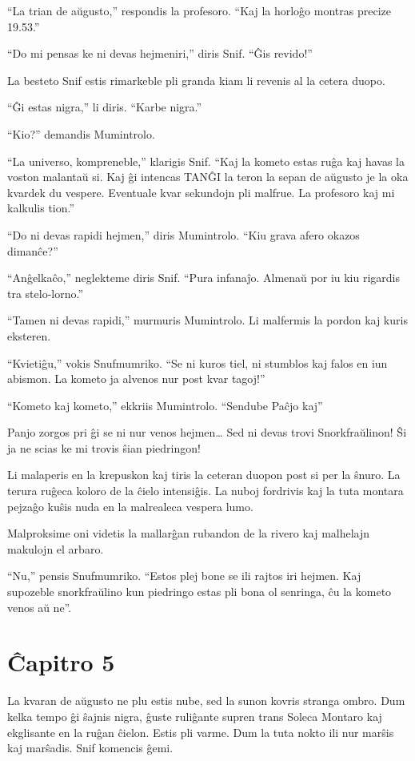 ``La trian de aŭgusto,'' respondis la profesoro. ``Kaj la horloĝo montras precize 19.53.''

``Do mi pensas ke ni devas hejmeniri,'' diris Snif. ``Ĝis revido!''

La besteto Snif estis rimarkeble pli granda kiam li revenis al la cetera duopo.

``Ĝi estas nigra,'' li diris. ``Karbe nigra.''

``Kio?'' demandis Mumintrolo.

``La universo, kompreneble,'' klarigis Snif. ``Kaj la kometo estas ruĝa kaj havas la voston malantaŭ si. Kaj ĝi intencas TANĜI la teron la sepan de aŭgusto je la oka kvardek du vespere. Eventuale kvar sekundojn pli malfrue. La profesoro kaj mi kalkulis tion.''

``Do ni devas rapidi hejmen,'' diris Mumintrolo. ``Kiu grava afero okazos dimanĉe?''

``Anĝelkaĉo,'' neglekteme diris Snif. ``Pura infanaĵo. Almenaŭ por iu kiu rigardis tra stelo-lorno.''

``Tamen ni devas rapidi,'' murmuris Mumintrolo. Li malfermis la pordon kaj kuris eksteren.

``Kvietiĝu,'' vokis Snufmumriko. ``Se ni kuros tiel, ni stumblos kaj falos en iun abismon. La kometo ja alvenos nur post kvar tagoj!''

``Kometo kaj kometo,'' ekkriis Mumintrolo. ``Sendube Paĉjo kaj''

Panjo zorgos pri ĝi se ni nur venos hejmen{\ldots} Sed ni devas trovi Snorkfraŭlinon! Ŝi ja ne scias ke mi trovis ŝian piedringon!

Li malaperis en la krepuskon kaj tiris la ceteran duopon post si per la ŝnuro. La terura ruĝeca koloro de la ĉielo intensiĝis. La nuboj fordrivis kaj la tuta montara pejzaĝo kuŝis nuda en la malrealeca vespera lumo.

Malproksime oni videtis la mallarĝan rubandon de la rivero kaj malhelajn makulojn el arbaro.

``Nu,'' pensis Snufmumriko. ``Estos plej bone se ili rajtos iri hejmen. Kaj supozeble snorkfraŭlino kun piedringo estas pli bona ol senringa, ĉu la kometo venos aŭ ne''.

\chapter*[Ĉapitro 5]{Ĉapitro 5}


La kvaran de aŭgusto ne plu estis nube, sed la sunon kovris stranga ombro. Dum kelka tempo ĝi ŝajnis nigra, ĝuste ruliĝante supren trans Soleca Montaro kaj ekglisante en la ruĝan ĉielon. Estis pli varme. Dum la tuta nokto ili nur marŝis kaj marŝadis. Snif komencis ĝemi.

